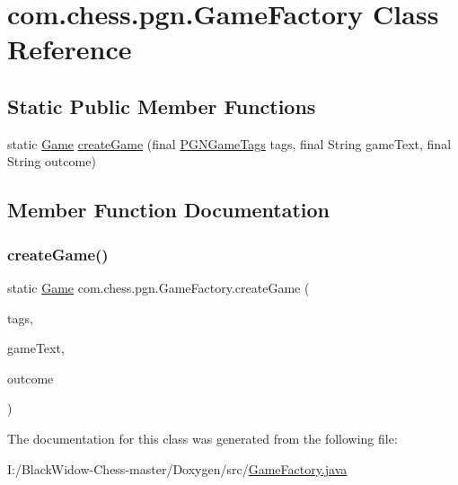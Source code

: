 \hypertarget{classcom_1_1chess_1_1pgn_1_1_game_factory}{}\section{com.\+chess.\+pgn.\+Game\+Factory Class Reference}
\label{classcom_1_1chess_1_1pgn_1_1_game_factory}
\subsection*{Static Public Member Functions}
\begin{DoxyCompactItemize}
\item 
static \mbox{\hyperlink{classcom_1_1chess_1_1pgn_1_1_game}{Game}} \mbox{\hyperlink{classcom_1_1chess_1_1pgn_1_1_game_factory_a431b2c0d0149617529356c722fd53df5}{create\+Game}} (final \mbox{\hyperlink{classcom_1_1chess_1_1pgn_1_1_p_g_n_game_tags}{P\+G\+N\+Game\+Tags}} tags, final String game\+Text, final String outcome)
\end{DoxyCompactItemize}


\subsection{Member Function Documentation}
\mbox{\label{classcom_1_1chess_1_1pgn_1_1_game_factory_a431b2c0d0149617529356c722fd53df5}} 
\subsubsection{\texorpdfstring{createGame()}{createGame()}}
{\footnotesize\ttfamily static \mbox{\hyperlink{classcom_1_1chess_1_1pgn_1_1_game}{Game}} com.\+chess.\+pgn.\+Game\+Factory.\+create\+Game (\begin{DoxyParamCaption}\item[{final \mbox{\hyperlink{classcom_1_1chess_1_1pgn_1_1_p_g_n_game_tags}{P\+G\+N\+Game\+Tags}}}]{tags,  }\item[{final String}]{game\+Text,  }\item[{final String}]{outcome }\end{DoxyParamCaption})\hspace{0.3cm}{\ttfamily [static]}}



The documentation for this class was generated from the following file\+:\begin{DoxyCompactItemize}
\item 
I\+:/\+Black\+Widow-\/\+Chess-\/master/\+Doxygen/src/\mbox{\hyperlink{_game_factory_8java}{Game\+Factory.\+java}}\end{DoxyCompactItemize}
